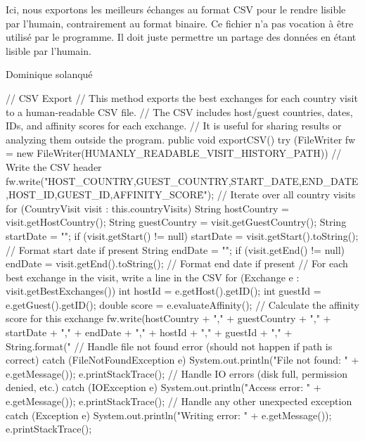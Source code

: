 \documentclass{mytex}
\begin{document}


Ici, nous exportons les meilleurs échanges au format CSV pour le rendre lisible par l'humain, contrairement au format binaire. Ce fichier n'a pas vocation à être utilisé par le programme. Il doit juste permettre un partage des données en étant lisible par l'humain.

Dominique solanqué




\begin{codebox}
// CSV Export
// This method exports the best exchanges for each country visit to a human-readable CSV file.
// The CSV includes host/guest countries, dates, IDs, and affinity scores for each exchange.
// It is useful for sharing results or analyzing them outside the program.
public void exportCSV() {
	try (FileWriter fw = new FileWriter(HUMANLY_READABLE_VISIT_HISTORY_PATH)) {
		// Write the CSV header
		fw.write("HOST_COUNTRY,GUEST_COUNTRY,START_DATE,END_DATE,HOST_ID,GUEST_ID,AFFINITY_SCORE\r\n");
		// Iterate over all country visits
		for (CountryVisit visit : this.countryVisits) {
			String hostCountry = visit.getHostCountry();
			String guestCountry = visit.getGuestCountry();
			String startDate = "";
			if (visit.getStart() != null) startDate = visit.getStart().toString(); // Format start date if present
			String endDate = "";
			if (visit.getEnd() != null) endDate = visit.getEnd().toString(); // Format end date if present
			// For each best exchange in the visit, write a line in the CSV
			for (Exchange e : visit.getBestExchanges()) {
				int hostId = e.getHost().getID();
				int guestId = e.getGuest().getID();
				double score = e.evaluateAffinity(); // Calculate the affinity score for this exchange
				fw.write(hostCountry + "," + guestCountry + "," + startDate + "," + endDate + "," +
				hostId + "," + guestId + "," + String.format("%
			}
		}
	} 
	// Handle file not found error (should not happen if path is correct)
	catch (FileNotFoundException e) {
		System.out.println("File not found: " + e.getMessage());
		e.printStackTrace();
	}
	// Handle IO errors (disk full, permission denied, etc.)
	catch (IOException e) {
		System.out.println("Access error: " + e.getMessage());
		e.printStackTrace();
	}
	// Handle any other unexpected exception
	catch (Exception e) {
		System.out.println("Writing error: " + e.getMessage());
		e.printStackTrace();
	}
}
\end{codebox}
\end{document}
